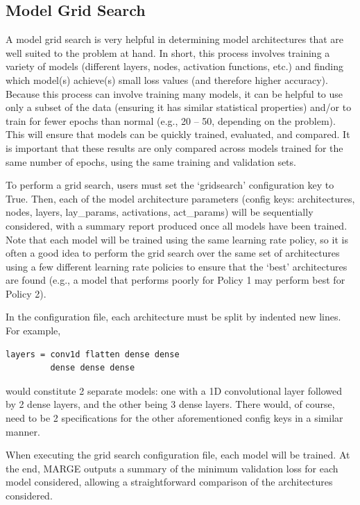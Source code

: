 \documentclass[letterpaper, 12pt]{article}
\begin{document}
\subsection{Model Grid Search}

A model grid search is very helpful in determining model architectures that are 
well suited to the problem at hand.  In short, this process involves training 
a variety of models (different layers, nodes, activation functions, etc.) and 
finding which model(s) achieve(s) small loss values (and therefore higher 
accuracy).  Because this process can involve training many models, it can be  
helpful to use only a subset of the data (ensuring it has similar statistical 
properties) and/or to train for fewer epochs than normal (e.g., 20 -- 50, 
depending on the problem).  This will ensure that models can be quickly 
trained, evaluated, and compared.  It is important that these results are 
only compared across models trained for the same number of epochs, using the 
same training and validation sets. \newline

\noindent To perform a grid search, users must set the `gridsearch' 
configuration key to True.  Then, each of the model architecture parameters 
(config keys: architectures, nodes, layers, lay_params, activations, act_params)
will be sequentially considered, with a summary report produced once all 
models have been trained.  Note that each model will be trained using the same 
learning rate policy, so it is often a good idea to perform the grid search over
the same set of architectures using a few different learning rate policies to 
ensure that the `best' architectures are found (e.g., a model that performs 
poorly for Policy 1 may perform best for Policy 2). \newline

\noindent In the configuration file, each architecture must be split by indented
new lines.  For example, 
\begin{verbatim}
layers = conv1d flatten dense dense
         dense dense dense
\end{verbatim}
\noindent would constitute 2 separate models: one with a 1D convolutional layer 
followed by 2 dense layers, and the other being 3 dense layers.  There would, 
of course, need to be 2 specifications for the other aforementioned config keys 
in a similar manner.\newline

\noindent When executing the grid search configuration file, each model will 
be trained.  At the end, MARGE outputs a summary of the minimum validation loss 
for each model considered, allowing a straightforward comparison of the 
architectures considered.
\end{document}
